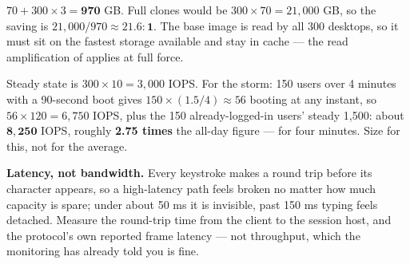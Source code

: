 \begin{ans}
  \item $70 + 300 \times 3 = \mathbf{970}$ GB. Full clones would be
        $300 \times 70 = 21{,}000$ GB, so the saving is
        $21{,}000/970 \approx \mathbf{21.6:1}$. The base image is read by all
        300 desktops, so it must sit on the fastest storage available and stay
        in cache --- the read amplification of  applies at full
        force.
  \item Steady state is $300 \times 10 = 3{,}000$ IOPS. For the storm: 150
        users over 4 minutes with a 90-second boot gives
        $150 \times (1.5/4) \approx 56$ booting at any instant, so
        $56 \times 120 = 6{,}750$ IOPS, plus the 150 already-logged-in users'
        steady 1{,}500: about $\mathbf{8{,}250}$ IOPS, roughly
        \textbf{2.75 times} the all-day figure --- for four minutes. Size for
        this, not for the average.
  \item \textbf{Latency, not bandwidth.} Every keystroke makes a round trip
        before its character appears, so a high-latency path feels broken no
        matter how much capacity is spare; under about 50 ms it is invisible,
        past 150 ms typing feels detached. Measure the round-trip time from the
        client to the session host, and the protocol's own reported frame
        latency --- not throughput, which the monitoring has already told you is
        fine.
\end{ans}

